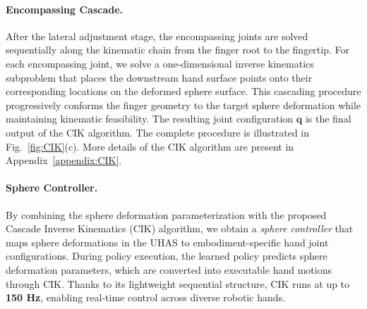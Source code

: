 \vspace{-2mm}
\paragraph{Encompassing Cascade.}
After the lateral adjustment stage, the encompassing joints are solved sequentially along the kinematic chain from the finger root to the fingertip. For each encompassing joint, we solve a one-dimensional inverse kinematics subproblem that places the downstream hand surface points onto their corresponding locations on the deformed sphere surface. This cascading procedure progressively conforms the finger geometry to the target sphere deformation while maintaining kinematic feasibility. The resulting joint configuration $\mathbf{q}$ is the final output of the CIK algorithm. The complete procedure is illustrated in Fig.~\ref{fig:CIK}(c). More details of the CIK algorithm are present in Appendix~\ref{appendix:CIK}.

\paragraph{Sphere Controller.}
By combining the sphere deformation parameterization with the proposed Cascade Inverse Kinematics (CIK) algorithm, we obtain a \emph{sphere controller} that maps sphere deformations in the UHAS to embodiment-specific hand joint configurations. During policy execution, the learned policy predicts sphere deformation parameters, which are converted into executable hand motions through CIK. Thanks to its lightweight sequential structure, CIK runs at up to \textbf{150 Hz}, enabling real-time control across diverse robotic hands.




